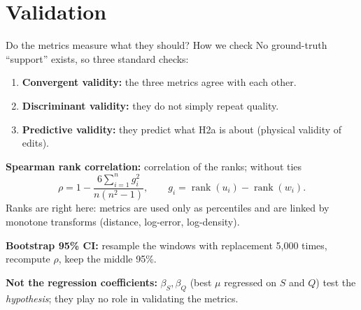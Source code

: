 \documentclass[aspectratio=169,11pt]{beamer}
\begin{document}
\section{Validation}
\begin{frame}{Do the metrics measure what they should? How we check}
No ground-truth ``support'' exists, so three standard checks:
\begin{enumerate}
\item \textbf{Convergent validity:} the three metrics agree with each other.
\item \textbf{Discriminant validity:} they do not simply repeat quality.
\item \textbf{Predictive validity:} they predict what H2a is about (physical validity of edits).
\end{enumerate}
\vspace{0.4em}
\textbf{Spearman rank correlation:} correlation of the ranks; without ties
\[
\rho=1-\frac{6\sum_{i=1}^{n}g_i^2}{n(n^2-1)},\qquad g_i=\operatorname{rank}(u_i)-\operatorname{rank}(w_i).
\]
Ranks are right here: metrics are used only as percentiles and are linked by monotone transforms (distance, log-error, log-density).
\vspace{0.3em}

\textbf{Bootstrap 95\% CI:} resample the windows with replacement 5{,}000 times, recompute $\rho$, keep the middle 95\%.
\vspace{0.3em}

\textbf{Not the regression coefficients:} $\beta_S,\beta_Q$ (best $\mu$ regressed on $S$ and $Q$) test the \emph{hypothesis}; they play no role in validating the metrics.
\end{frame}
\end{document}
